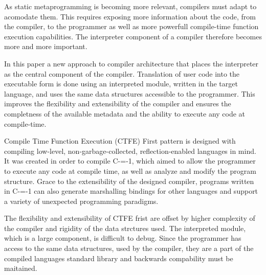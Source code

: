 As static metaprogramming is becoming more relevant, compilers must adapt to acomodate them.
This requires exposing more information about the code, from the compiler, to the programmer as well as more powerfull compile-time function execution capabilities.
The interpreter component of a compiler therefore becomes more and more important.

In this paper a new approach to compiler architecture that places the interpreter as the central component of the compiler.
Translation of user code into the executable form is done using an interpreted module, written in the target language, and uses the same data structures accessible to the programmer.
This improves the flexibility and extensibility of the compiler and ensures the completness of the available metadata and the ability to execute any code at compile-time.

Compile Time Function Execution (CTFE) First pattern is designed with compiling low-level, non-garbage-collected, reflection-enabled languages in mind.
It was created in order to compile C-=-1, which aimed to allow the programmer to execute any code at compile time, as well as analyze and modify the program structure.
Grace to the extensibility of the designed compiler, programs written in C-=-1 can also generate marshalling bindings for other languages and support a variety of unexpected programming paradigms.

The flexibility and extensibility of CTFE frist are offset by higher complexity of the compiler and rigidity of the data strctures used.
The interpreted module, which is a large component, is difficult to debug.
Since the programmer has access to the same data structures, used by the compiler, they are a part of the compiled languages standard library and backwards compability must be maitained.
